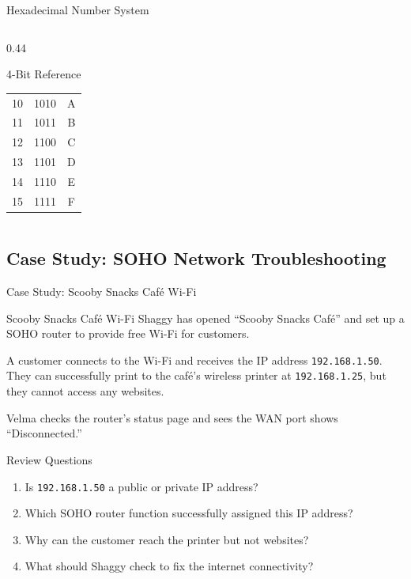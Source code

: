 \documentclass[aspectratio=169]{beamer}  %
\begin{document}
\begin{frame}{Hexadecimal Number System}
\begin{columns}[T]
\begin{column}{0.44\textwidth}
\begin{block}{4-Bit Reference}
\begin{tabular}{c c c}
                    10 & 1010 & A \\
                    11 & 1011 & B \\
                    12 & 1100 & C \\
                    13 & 1101 & D \\
                    14 & 1110 & E \\
                    15 & 1111 & F \\
                \end{tabular}
            \end{block}
        \end{column}
    \end{columns}
\end{frame}

\subsection{Case Study: SOHO Network Troubleshooting}

\begin{frame}{Case Study: Scooby Snacks Café Wi-Fi}
    \begin{casestudy}{Scooby Snacks Café Wi-Fi}
        Shaggy has opened ``Scooby Snacks Café'' and set up a SOHO router to provide free Wi-Fi for customers.
        
        \vspace{0.5em}
        A customer connects to the Wi-Fi and receives the IP address \texttt{192.168.1.50}. They can successfully print to the café's wireless printer at \texttt{192.168.1.25}, but they cannot access any websites.
        
        \vspace{0.5em}
        Velma checks the router's status page and sees the WAN port shows ``Disconnected.''
    \end{casestudy}
    
    \begin{block}{Review Questions}
        \begin{enumerate}
            \item Is \texttt{192.168.1.50} a public or private IP address?
            \item Which SOHO router function successfully assigned this IP address?
            \item Why can the customer reach the printer but not websites?
            \item What should Shaggy check to fix the internet connectivity?
        \end{enumerate}
    \end{block}
\end{frame}
\end{document}
